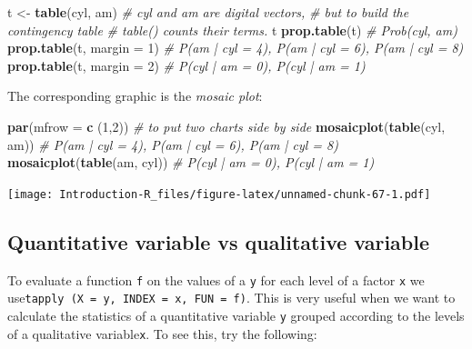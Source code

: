 \documentclass[]{book}
\newenvironment{Shaded}{\begin{snugshade}}{\end{snugshade}}
\newcommand{\CommentTok}[1]{\textcolor[rgb]{0.56,0.35,0.01}{\textit{#1}}}
\newcommand{\DataTypeTok}[1]{\textcolor[rgb]{0.13,0.29,0.53}{#1}}
\newcommand{\DecValTok}[1]{\textcolor[rgb]{0.00,0.00,0.81}{#1}}
\newcommand{\KeywordTok}[1]{\textcolor[rgb]{0.13,0.29,0.53}{\textbf{#1}}}
\newcommand{\NormalTok}[1]{#1}
\newcommand{\OperatorTok}[1]{\textcolor[rgb]{0.81,0.36,0.00}{\textbf{#1}}}
\newcommand{\StringTok}[1]{\textcolor[rgb]{0.31,0.60,0.02}{#1}}
\begin{document}
\begin{Shaded}
\begin{Highlighting}[]
\NormalTok{t <-}\StringTok{ }\KeywordTok{table}\NormalTok{(cyl, am)}
\CommentTok{# cyl and am are digital vectors,}
\CommentTok{# but to build the contingency table}
\CommentTok{# table() counts their terms.}
\NormalTok{t}
\KeywordTok{prop.table}\NormalTok{(t) }\CommentTok{# Prob(cyl, am)}
\KeywordTok{prop.table}\NormalTok{(t, }\DataTypeTok{margin =} \DecValTok{1}\NormalTok{) }\CommentTok{# P(am | cyl = 4), P(am | cyl = 6), P(am | cyl = 8)}
\KeywordTok{prop.table}\NormalTok{(t, }\DataTypeTok{margin =} \DecValTok{2}\NormalTok{) }\CommentTok{# P(cyl | am = 0), P(cyl | am = 1)}
\end{Highlighting}
\end{Shaded}

The corresponding graphic is the \emph{mosaic plot}:

\begin{Shaded}
\begin{Highlighting}[]
\KeywordTok{par}\NormalTok{(}\DataTypeTok{mfrow =} \KeywordTok{c}\NormalTok{ (}\DecValTok{1}\NormalTok{,}\DecValTok{2}\NormalTok{)) }\CommentTok{# to put two charts side by side}
\KeywordTok{mosaicplot}\NormalTok{(}\KeywordTok{table}\NormalTok{(cyl, am)) }\CommentTok{# P(am | cyl = 4), P(am | cyl = 6), P(am | cyl = 8)}
\KeywordTok{mosaicplot}\NormalTok{(}\KeywordTok{table}\NormalTok{(am, cyl)) }\CommentTok{# P(cyl | am = 0), P(cyl | am = 1)}
\end{Highlighting}
\end{Shaded}

\texttt{[image: Introduction-R\_files/figure-latex/unnamed-chunk-67-1.pdf]}

\hypertarget{quantitative-variable-vs-qualitative-variable}{%
\subsection{Quantitative variable vs qualitative variable}\label{quantitative-variable-vs-qualitative-variable}}

To evaluate a function \texttt{f} on the values of a \texttt{y} for each level of a factor \texttt{x} we use\texttt{tapply\ (X\ =\ y,\ INDEX\ =\ x,\ FUN\ =\ f)}. This is very useful when we want to calculate the statistics of a quantitative variable \texttt{y} grouped according to the levels of a qualitative variable\texttt{x}. To see this, try the following:

\begin{Shaded}
\end{Shaded}
\end{document}
